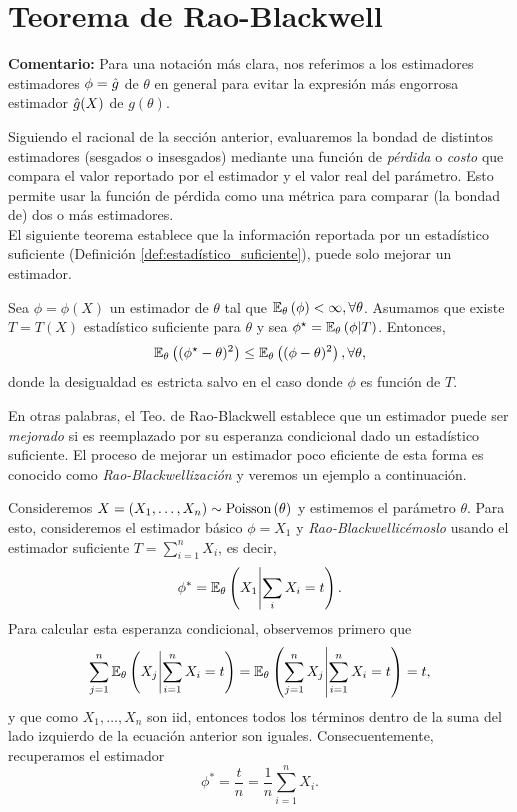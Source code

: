 \section{Teorema de Rao-Blackwell}
\textbf{Comentario:} Para una notación más clara, nos referimos  a los estimadores estimadores $\phi={ \hat{g}}$ de $\theta$ en general para evitar la expresión más engorrosa estimador ${ \hat{g}}(X)$ de $g(\theta)$.

Siguiendo el racional de la sección anterior, evaluaremos la bondad de distintos estimadores (sesgados o insesgados) mediante una función de \textit{pérdida} o \textit{costo} que compara el valor reportado por el estimador y el valor real del parámetro. Esto permite usar la función de pérdida como una métrica para comparar (la bondad de) dos o más estimadores.\\

El siguiente teorema establece que la información reportada por un estadístico suficiente (Definición \ref{def:estadístico_suficiente}), puede solo mejorar un estimador. 

\begin{theorem}
	\label{teo:rao-blackwell}
	Sea $\phi = \phi(X)$ un estimador de $\theta$ tal que $\mathbb{E}_\theta \left(\phi\right)<\infty, \forall \theta$. Asumamos que existe $T=T(X)$ estadístico suficiente para $\theta$ y sea $\phi^\star = \mathbb{E}_\theta \left(\phi|T\right)$. Entonces, 
	\begin{equation}
		\mathbb{E}_\theta \left((\phi^\star-\theta)^2\right) \leq \mathbb{E}_\theta \left((\phi-\theta)^2\right), \forall\theta,
	\end{equation}
	donde la desigualdad es estricta salvo en el caso donde $\phi$ es función de $T$.
\end{theorem}

En otras palabras, el Teo. de Rao-Blackwell establece que un estimador puede ser \textit{mejorado} si es reemplazado por su esperanza condicional dado un estadístico suficiente. El proceso de mejorar un estimador poco eficiente de esta forma es conocido como \textit{Rao-Blackwellización} y veremos un ejemplo a continuación.


\begin{example}
Consideremos $X = (X_1,\ldots,X_n)\sim \text{Poisson}\left(\theta\right)$ y estimemos el parámetro $\theta$. Para esto, consideremos el estimador básico $\phi = X_1$ y \textit{Rao-Blackwellicémoslo} usando el estimador suficiente $T=\sum_{i=1}^nX_i$, es decir, 
\begin{equation}
	\phi^* = \mathbb{E}_\theta \left(X_1\middle|\sum_i X_i=t\right).
\end{equation}
Para calcular esta esperanza condicional, observemos primero que  
\begin{equation}
	\sum_{j=1}^n\mathbb{E}_\theta \left(X_j\middle|\sum_{i=1}^n X_i=t\right) = \mathbb{E}_\theta \left(\sum_{j=1}^nX_j\middle|\sum_{i=1}^n X_i=t\right) = t,
\end{equation}
y que como $X_1,\ldots,X_n$ son iid, entonces todos los términos dentro de la suma del lado izquierdo de la ecuación anterior son iguales. Consecuentemente, recuperamos el estimador
\begin{equation}
 	\phi^* = \frac{t}{n} = \frac{1}{n}\sum_{i=1}^nX_i.
 \end{equation} 
\end{example}

